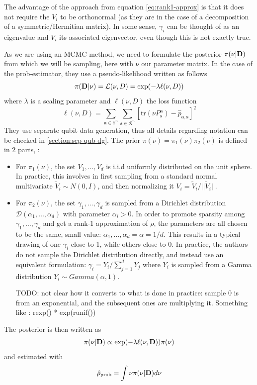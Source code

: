 \documentclass[12pt]{memoir}
\newcommand{\tr}{\text{tr}}
\newcommand{\mb}{\mathbf}
\newcommand{\tb}{\textbf}
\begin{document}
The advantage of the approach from equation \ref{eq:rank1-approx} is that it does not require the $V_i$ to be orthonormal (as they are in the case of a decomposition of a symmetric/Hermitian matrix). In some sense, $\gamma_i$ can be thought of as an eigenvalue and $V_i$ its associated eigenvector, even though this is not exactly true. \medbreak

As we are using an MCMC method, we need to formulate the posterior $\pi(\nu | \tb D)$ from which we will be sampling, here with $\nu$ our parameter matrix. In the case of the prob-estimator, they use a pseudo-likelihood written as follows
\begin{equation}
    \pi(\tb D| \nu) = \mathcal{L}(\nu, D) = \exp(-\lambda \ell(\nu, D))
\end{equation}
where $\lambda$ is a scaling parameter and $\ell(\nu, D)$ the loss function
\begin{equation}
    \ell(\nu, D) = \sum_{\mb a \in \mathcal{E}^n} \sum_{\mb s \in \mathcal{R}^n} \left[\tr(\nu P^{\mb a}_{\mb s}) - \hat p_{\mb a,\mb s}\right]^2
\end{equation}\medbreak
They use separate qubit data generation, thus all details regarding notation can be checked in \ref{section:sep-qub-dg}.
The prior $\pi(\nu) = \pi_1(\nu) \pi_2(\nu)$ is defined in 2 parts, :
\begin{itemize}
    \item For $\pi_1(\nu)$, the set $V_1, \dots, V_d$ is i.i.d uniformly distributed on the unit sphere. In practice, this involves in first sampling from a standard normal multivariate $\tilde V_i \sim N(0, I)$, and then normalizing it $V_i = \tilde V_i/||\tilde V_i||$.
    \item For $\pi_2(\nu)$, the set $\gamma_1,\dots,\gamma_d$ is sampled from a Dirichlet distribution $\mathcal{D}(\alpha_1,\dots,\alpha_d)$ with parameter $\alpha_i > 0$. In order to promote sparsity among $\gamma_1, \dots, \gamma_d$ and get a rank-1 approximation of $\rho$, the parameters are all chosen to be the same, small value: $\alpha_1,\dots,\alpha_d = \alpha = 1/d$. This results in a typical drawing of one $\gamma_i$ close to 1, while others close to 0. In practice, the authors do not sample the Dirichlet distribution directly, and instead use an equivalent formulation: $\gamma_i = Y_i/\sum_{j=1}^{d} Y_j$ where $Y_i$ is sampled from a Gamma distribution $Y_i \sim Gamma(\alpha, 1)$. 
    
    TODO: not clear how it converts to what is done in practice: sample 0 is from an exponential, and the subsequent ones are multiplying it. Something like : rexp() * exp(runif())  
\end{itemize}
The posterior is then written as 
\begin{equation}
    \pi(\nu|\tb D) \propto \exp(-\lambda\ell(\nu, \mb D)) \pi(\nu)
\end{equation}
and estimated with 
\begin{equation}
    \hat \rho_{\text{prob}} = \int \nu \pi(\nu|\tb D) d\nu
\end{equation}
\end{document}
